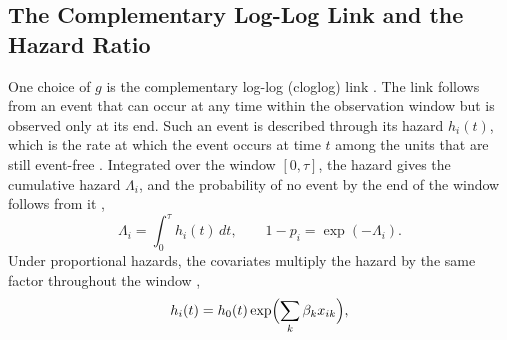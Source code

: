 \subsection{The Complementary Log-Log Link and the Hazard Ratio}
\label{sec:tech-segment-glmm}

One choice of $g$ is the complementary log-log (cloglog) link \cite[Section~7.3]{dobson2002glm}.
The link follows from an event that can occur at any time within the observation window but is observed only at its end.
Such an event is described through its hazard $h_i(t)$, which is the rate at which the event occurs at time $t$ among the units that are still event-free \cite[Section~10.2]{dobson2002glm}.
Integrated over the window $[0, \tau]$, the hazard gives the cumulative hazard $\Lambda_i$, and the probability of no event by the end of the window follows from it \cite[Section~10.2, Eq.~10.4]{dobson2002glm},
\begin{equation}
  \Lambda_i = \int_0^{\tau} h_i(t)\,dt ,
  \qquad
  1 - p_i = \exp(-\Lambda_i) .
  \label{eq:tech-cumhaz}
\end{equation}
Under proportional hazards, the covariates multiply the hazard by the same factor throughout the window \cite[Section~10.2.2, Eq.~10.8]{dobson2002glm},
\begin{equation}
  h_i(t) = h_0(t) \exp\Bigl(\sum_k \beta_k x_{ik}\Bigr),
  \label{eq:tech-ph}
\end{equation}
